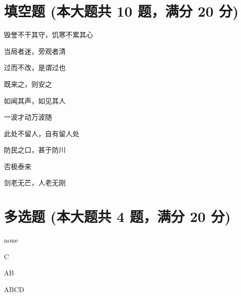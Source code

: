 \documentclass[12pt, a4paper, addpoints]{exam}
\begin{document}
\hspace{5cm}

\section{\normalsize{填空题 (本大题共 10 题，满分 20 分)}}
\hspace{1.5cm}
\begin{multicols}{2}
\begin{questions}
\question[2] 毁誉不干其守，饥寒不累其心

\question[2] 当局者迷，旁观者清

\question[2] 过而不改，是谓过也

\question[2] 既来之，则安之

\question[2] 如闻其声，如见其人

\question[2] 一波才动万波随

\question[2] 此处不留人，自有留人处

\question[2] 防民之口，甚于防川

\question[2] 否极泰来

\question[2] 剑老无芒，人老无刚

\end{questions}
\end{multicols}

\hspace{5cm}

\section{\normalsize{多选题 (本大题共 4 题，满分 20 分)}}
\hspace{1.5cm}

\begin{questions}
\question[5] none

\begin{oneparcheckboxes}
\end{oneparcheckboxes}

\question[5] C

\begin{oneparcheckboxes}
\end{oneparcheckboxes}

\question[5] AB

\begin{oneparcheckboxes}
\end{oneparcheckboxes}

\question[5] ABCD

\begin{oneparcheckboxes}
\end{oneparcheckboxes}

\end{questions}
\end{document}
